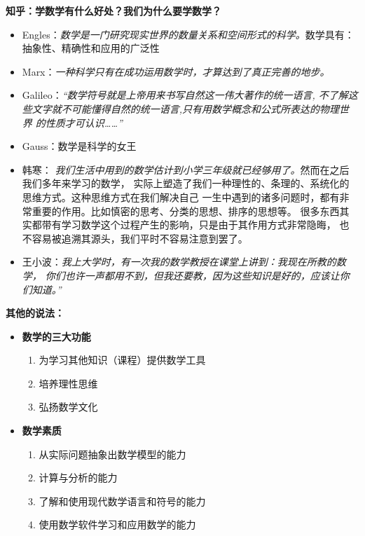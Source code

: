 \begin{shaded}
	{\bf 知乎：学数学有什么好处？我们为什么要学数学？}
	\begin{itemize}
	  \item Engles：{\it 数学是一门研究现实世界的数量关系和空间形式的科学。}数学具有：
	  抽象性、精确性和应用的广泛性
	  \item Marx：{\it 一种科学只有在成功运用数学时，才算达到了真正完善的地步。}
	  \item Galileo：{\it “数学符号就是上帝用来书写自然这一伟大著作的统一语言,
	  不了解这些文字就不可能懂得自然的统一语言,只有用数学概念和公式所表达的物理世界
	  的性质才可认识……”}
	  \item Gauss：{数学是科学的女王}
	  \item 韩寒：{\it
	  我们生活中用到的数学估计到小学三年级就已经够用了。}然而在之后我们多年来学习的数学，
	  实际上塑造了我们一种理性的、条理的、系统化的思维方式。这种思维方式在我们解决自己
	  一生中遇到的诸多问题时，都有非常重要的作用。比如慎密的思考、分类的思想、排序的思想等。
	  很多东西其实都带有学习数学这个过程产生的影响，只是由于其作用方式非常隐晦，
	  也不容易被追溯其源头，我们平时不容易注意到罢了。
	  \item 王小波：{\it 我上大学时，有一次我的数学教授在课堂上讲到：我现在所教的数学，
	  你们也许一声都用不到，但我还要教，因为这些知识是好的，应该让你们知道。”}
	\end{itemize}

	{\bf 其他的说法：}
	\begin{itemize}
	  \item {\bf 数学的三大功能}
	  \begin{enumerate}
	    \item 为学习其他知识（课程）提供数学工具
	    \item 培养理性思维
	    \item 弘扬数学文化
	  \end{enumerate}
	  \item {\bf 数学素质}
	  \begin{enumerate}
	    \item 从实际问题抽象出数学模型的能力
	    \item 计算与分析的能力
	    \item 了解和使用现代数学语言和符号的能力
	    \item 使用数学软件学习和应用数学的能力
	  \end{enumerate}
	\end{itemize}
\end{shaded}

